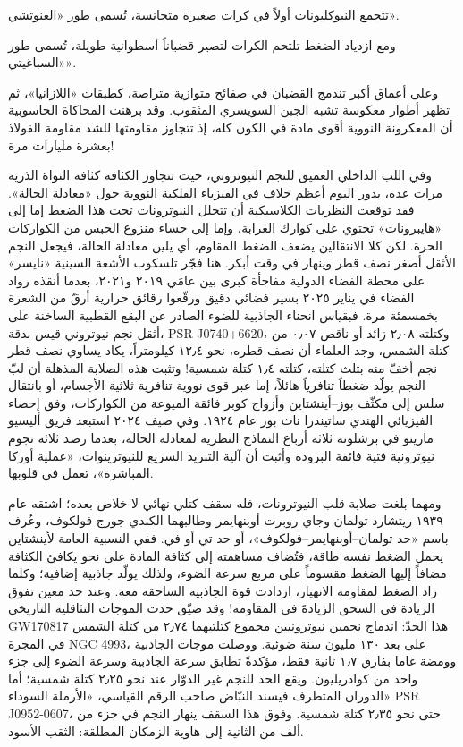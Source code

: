 \documentclass[12pt,a4paper,openany]{book}
\begin{document}
تتجمع النيوكليونات أولاً في كرات صغيرة متجانسة، تُسمى طور «الغنوتشي».


ومع ازدياد الضغط تلتحم الكرات لتصير قضباناً أسطوانية طويلة، تُسمى طور «السباغيتي».


وعلى أعماق أكبر تندمج القضبان في صفائح متوازية متراصة، كطبقات «اللازانيا»، ثم تظهر أطوار معكوسة تشبه الجبن السويسري المثقوب. وقد برهنت المحاكاة الحاسوبية أن المعكرونة النووية أقوى مادة في الكون كله، إذ تتجاوز مقاومتها للشد مقاومة الفولاذ بعشرة مليارات مرة!


وفي اللب الداخلي العميق للنجم النيوتروني، حيث تتجاوز الكثافة كثافة النواة الذرية مرات عدة، يدور اليوم أعظم خلاف في الفيزياء الفلكية النووية حول «معادلة الحالة». فقد توقعت النظريات الكلاسيكية أن تتحلل النيوترونات تحت هذا الضغط إما إلى «هايبرونات» تحتوي على كوارك الغرابة، وإما إلى حساء منزوع الحبس من الكواركات الحرة. لكن كلا الانتقالين يضعف الضغط المقاوم، أي يلين معادلة الحالة، فيجعل النجم الأثقل أصغر نصف قطر وينهار في وقت أبكر. هنا فجّر تلسكوب الأشعة السينية «نايسر» على محطة الفضاء الدولية مفاجأة كبرى بين عامَي ٢٠١٩ و٢٠٢١، بعدما أنقذه رواد الفضاء في يناير ٢٠٢٥ بسير فضائي دقيق ورقّعوا رقائق حرارية أرقّ من الشعرة بخمسمئة مرة. فبقياس انحناء الجاذبية للضوء الصادر عن البقع القطبية الساخنة على أثقل نجم نيوتروني قيس بدقة، PSR J0740+6620، وكتلته ٢٫٠٨ زائد أو ناقص ٠٫٠٧ من كتلة الشمس، وجد العلماء أن نصف قطره، نحو ١٢٫٤ كيلومتراً، يكاد يساوي نصف قطر نجم أخفّ منه بثلث كتلته، كتلته ١٫٤ كتلة شمسية! وتثبت هذه الصلابة المذهلة أن لبّ النجم يولّد ضغطاً تنافرياً هائلاً، إما عبر قوى نووية تنافرية ثلاثية الأجسام، أو بانتقال سلس إلى مكثّف بوز–أينشتاين وأزواج كوبر فائقة الميوعة من الكواركات، وفق إحصاء الفيزيائي الهندي ساتيندرا ناث بوز عام ١٩٢٤. وفي صيف ٢٠٢٤ استبعد فريق أليسيو مارينو في برشلونة ثلاثة أرباع النماذج النظرية لمعادلة الحالة، بعدما رصد ثلاثة نجوم نيوترونية فتية فائقة البرودة وأثبت أن آلية التبريد السريع للنيوترينوات، «عملية أوركا المباشرة»، تعمل في قلوبها.


ومهما بلغت صلابة قلب النيوترونات، فله سقف كتلي نهائي لا خلاص بعده؛ اشتقه عام ١٩٣٩ ريتشارد تولمان وجاي روبرت أوبنهايمر وطالبهما الكندي جورج فولكوف، وعُرف باسم «حد تولمان–أوبنهايمر–فولكوف»، أو حد تي أو في. ففي النسبية العامة لأينشتاين يحمل الضغط نفسه طاقة، فتُضاف مساهمته إلى كثافة المادة على نحو يكافئ الكثافة مضافاً إليها الضغط مقسوماً على مربع سرعة الضوء، ولذلك يولّد جاذبية إضافية؛ وكلما زاد الضغط لمقاومة الانهيار، ازدادت قوة الجاذبية الساحقة معه. وعند حد معين تفوق الزيادة في السحق الزيادةَ في المقاومة! وقد ضيّق حدث الموجات التثاقلية التاريخي GW170817 هذا الحدّ: اندماج نجمين نيوترونيين مجموع كتلتيهما ٢٫٧٤ من كتلة الشمس في المجرة NGC 4993، على بعد ١٣٠ مليون سنة ضوئية. ووصلت موجات الجاذبية وومضة غاما بفارق ١٫٧ ثانية فقط، مؤكدةً تطابق سرعة الجاذبية وسرعة الضوء إلى جزء واحد من كوادريليون. ويقع الحد للنجم غير الدوّار عند نحو ٢٫٢٥ كتلة شمسية؛ أما الدوران المتطرف فيسند النبّاض صاحب الرقم القياسي، «الأرملة السوداء» PSR J0952-0607، حتى نحو ٢٫٣٥ كتلة شمسية. وفوق هذا السقف ينهار النجم في جزء من ألف من الثانية إلى هاوية الزمكان المطلقة: الثقب الأسود.
\end{document}
